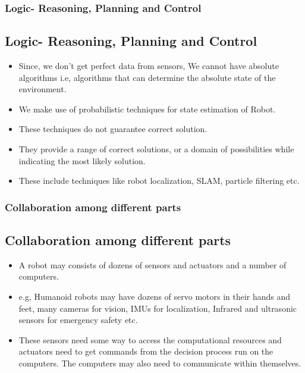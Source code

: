 \documentclass{beamer}
\begin{document}



	\begin{frame}
		\frametitle{Logic- Reasoning, Planning and Control}
		\subsection{Logic- Reasoning, Planning and Control}
		
		\begin{itemize}
			\item Since, we don't get perfect data from sensors, We cannot have absolute algorithms i.e, algorithms that can determine the absolute state of the environment.\medskip
			\item We make use of probabilistic techniques for state estimation of Robot.\medskip
			\item These techniques do not guarantee correct solution.\medskip
			\item They provide a range of correct solutions, or a domain of possibilities while indicating the most likely solution.\medskip
			\item These include techniques like robot localization, SLAM, particle filtering etc.
		\end{itemize}

	\end{frame}




	\begin{frame}
		\frametitle{Collaboration among different parts}
		\subsection{Collaboration among different parts}

		\begin{itemize}
			\item A robot may consists of dozens of sensors and actuators and a number of computers.\medskip
			\item e.g, Humanoid robots may have dozens of servo motors in their hands and feet, many cameras for vision, IMUs for localization, Infrared and ultrasonic sensors for emergency safety etc. \medskip
			\item These sensors need some way to access the computational resources and actuators need to get commands from the decision process run on the computers. The computers may also need to communicate within themselves.\medskip
		\end{itemize}

	\end{frame}
\end{document}
